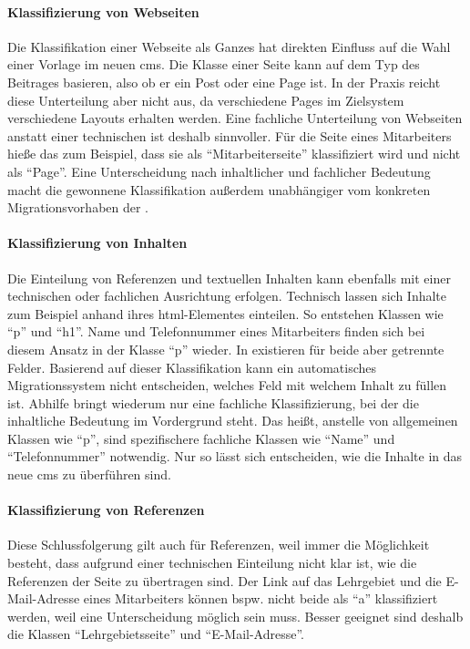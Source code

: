         \paragraph*{Klassifizierung von Webseiten}
        Die Klassifikation einer Webseite als Ganzes hat direkten Einfluss auf die Wahl einer Vorlage im neuen \gls{cms}.
        Die Klasse einer Seite kann auf dem Typ des Beitrages basieren,
        also ob er ein Post oder eine Page ist.
        In der Praxis reicht diese Unterteilung aber nicht aus,
        da verschiedene {\wordpress} Pages im Zielsystem verschiedene Layouts erhalten werden.
        Eine fachliche Unterteilung von Webseiten anstatt einer technischen ist deshalb sinnvoller.
        Für die Seite eines Mitarbeiters hieße das zum Beispiel,
        dass sie als "`Mitarbeiterseite"' klassifiziert wird und nicht als "`Page"'.
        Eine Unterscheidung nach inhaltlicher und fachlicher Bedeutung macht die
        gewonnene Klassifikation außerdem unabhängiger vom konkreten
        Migrationsvorhaben der {\fernUni}.

        \paragraph*{Klassifizierung von Inhalten}
        Die Einteilung von Referenzen und textuellen Inhalten kann ebenfalls
        mit einer technischen oder fachlichen Ausrichtung erfolgen.
        Technisch lassen sich Inhalte zum Beispiel anhand ihres \gls{html}-Elementes einteilen.
        So entstehen Klassen wie "`p"' und "`h1"'.
        Name und Telefonnummer eines Mitarbeiters finden sich bei diesem Ansatz in der Klasse "`p"' wieder.
        In {\imperia} existieren für beide aber getrennte Felder.
        Basierend auf dieser Klassifikation kann ein automatisches Migrationssystem
        nicht entscheiden, welches Feld mit welchem Inhalt zu füllen ist.
        Abhilfe bringt wiederum nur eine fachliche Klassifizierung,
        bei der die inhaltliche Bedeutung im Vordergrund steht.
        Das heißt, anstelle von allgemeinen Klassen wie "`p"',
        sind spezifischere fachliche Klassen wie
        "`Name"' und "`Telefonnummer"' notwendig.
        Nur so lässt sich entscheiden, wie die Inhalte in das neue \gls{cms}
        zu überführen sind.

        \paragraph*{Klassifizierung von Referenzen}
        Diese Schlussfolgerung gilt auch für Referenzen,
        weil immer die Möglichkeit besteht,
        dass aufgrund einer technischen Einteilung nicht klar ist,
        wie die Referenzen der Seite zu übertragen sind.
        Der Link auf das Lehrgebiet und die E-Mail-Adresse eines Mitarbeiters
        können bspw. nicht beide als "`a"' klassifiziert werden,
        weil eine Unterscheidung möglich sein muss.
        Besser geeignet sind deshalb die Klassen "`Lehrgebietsseite"'
        und "`E-Mail-Adresse"'.

